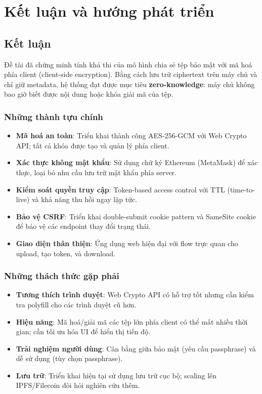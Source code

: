 \chapter{Kết luận và hướng phát triển}

\section{Kết luận}
Đề tài đã chứng minh tính khả thi của mô hình chia sẻ tệp bảo mật với mã hoá phía client (client-side encryption). Bằng cách lưu trữ ciphertext trên máy chủ và chỉ giữ metadata, hệ thống đạt được mục tiêu \textbf{zero-knowledge}: máy chủ không bao giờ biết được nội dung hoặc khóa giải mã của tệp.

\subsection*{Những thành tựu chính}
\begin{itemize}
  \item \textbf{Mã hoá an toàn}: Triển khai thành công AES-256-GCM với Web Crypto API; tất cả khóa được tạo và quản lý phía client.
  \item \textbf{Xác thực không mật khẩu}: Sử dụng chữ ký Ethereum (MetaMask) để xác thực, loại bỏ nhu cầu lưu trữ mật khẩu phía server.
  \item \textbf{Kiểm soát quyền truy cập}: Token-based access control với TTL (time-to-live) và khả năng thu hồi ngay lập tức.
  \item \textbf{Bảo vệ CSRF}: Triển khai double-submit cookie pattern và SameSite cookie để bảo vệ các endpoint thay đổi trạng thái.
  \item \textbf{Giao diện thân thiện}: Ứng dụng web hiện đại với flow trực quan cho upload, tạo token, và download.
\end{itemize}

\subsection*{Những thách thức gặp phải}
\begin{itemize}
  \item \textbf{Tương thích trình duyệt}: Web Crypto API có hỗ trợ tốt nhưng cần kiểm tra polyfill cho các trình duyệt cũ hơn.
  \item \textbf{Hiệu năng}: Mã hoá/giải mã các tệp lớn phía client có thể mất nhiều thời gian; cần tối ưu hóa UI để hiển thị tiến độ.
  \item \textbf{Trải nghiệm người dùng}: Cân bằng giữa bảo mật (yêu cầu passphrase) và dễ sử dụng (tùy chọn passphrase).
  \item \textbf{Lưu trữ}: Triển khai hiện tại sử dụng lưu trữ cục bộ; scaling lên IPFS/Filecoin đòi hỏi nghiên cứu thêm.
\end{itemize}

